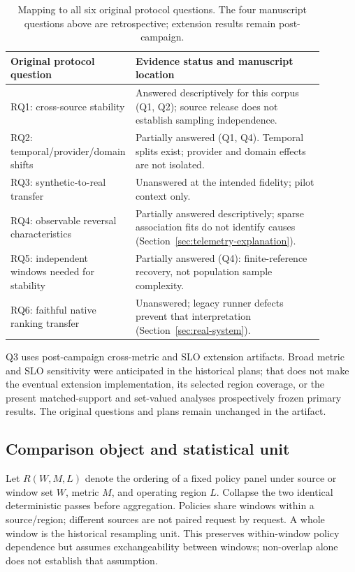 \begin{table}[t]\centering
\caption{Mapping to all six original protocol questions. The four manuscript
questions above are retrospective; extension results remain post-campaign.}
\label{tab:rq-map}
\begin{tabular}{p{0.29\linewidth}p{0.60\linewidth}}\toprule
Original protocol question & Evidence status and manuscript location\\\midrule
RQ1: cross-source stability & Answered descriptively for this corpus (Q1, Q2); source release does not establish sampling independence.\\
RQ2: temporal/provider/domain shifts & Partially answered (Q1, Q4). Temporal splits exist; provider and domain effects are not isolated.\\
RQ3: synthetic-to-real transfer & Unanswered at the intended fidelity; pilot context only.\\
RQ4: observable reversal characteristics & Partially answered descriptively; sparse association fits do not identify causes (Section~\ref{sec:telemetry-explanation}).\\
RQ5: independent windows needed for stability & Partially answered (Q4): finite-reference recovery, not population sample complexity.\\
RQ6: faithful native ranking transfer & Unanswered; legacy runner defects prevent that interpretation (Section~\ref{sec:real-system}).\\\bottomrule
\end{tabular}
\end{table}
Q3 uses post-campaign cross-metric and SLO extension artifacts. Broad
metric and SLO sensitivity were anticipated in the historical plans;
that does not make the eventual extension implementation, its selected
region coverage, or the present matched-support and set-valued analyses
prospectively frozen primary results. The original questions and plans
remain unchanged in the artifact.

\subsection{Comparison object and statistical unit}\label{sec:unit}
Let $R(W,M,L)$ denote the ordering of a fixed policy panel under source or
window set $W$, metric $M$, and operating region $L$. Collapse the two
identical deterministic passes before aggregation. Policies share windows
within a source/region; different sources are not paired request by request.
A whole window is the historical resampling unit. This preserves
within-window policy dependence but assumes exchangeability between
windows; non-overlap alone does not establish that assumption.

